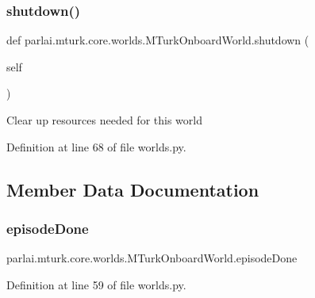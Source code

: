 \subsubsection{\texorpdfstring{shutdown()}{shutdown()}}
{\footnotesize\ttfamily def parlai.\+mturk.\+core.\+worlds.\+M\+Turk\+Onboard\+World.\+shutdown (\begin{DoxyParamCaption}\item[{}]{self }\end{DoxyParamCaption})}

\begin{DoxyVerb}Clear up resources needed for this world\end{DoxyVerb}
 

Definition at line 68 of file worlds.\+py.



\subsection{Member Data Documentation}
\mbox{\label{classparlai_1_1mturk_1_1core_1_1worlds_1_1MTurkOnboardWorld_a025e27063d46523f471e2ac600592019}} 
\subsubsection{\texorpdfstring{episode\+Done}{episodeDone}}
{\footnotesize\ttfamily parlai.\+mturk.\+core.\+worlds.\+M\+Turk\+Onboard\+World.\+episode\+Done}



Definition at line 59 of file worlds.\+py.



